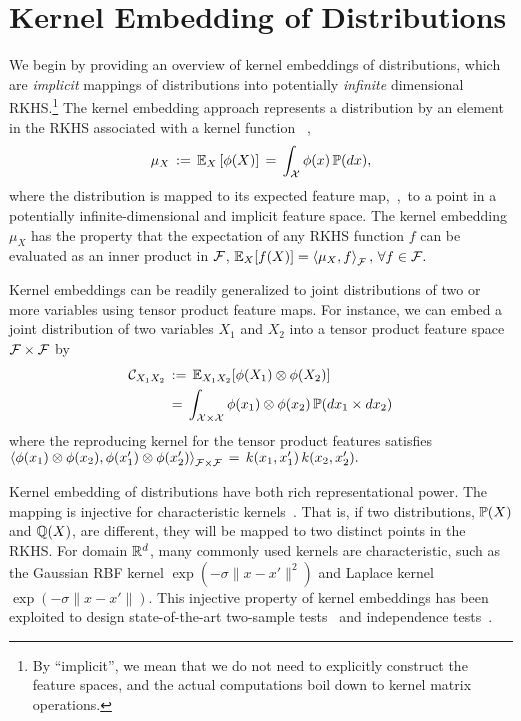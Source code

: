 \documentclass{article}
\begin{document}
\section{Kernel Embedding of Distributions}
\label{sec:embedding}

We begin by providing an overview of kernel embeddings of distributions, which are \emph{implicit} mappings of distributions into potentially \emph{infinite} dimensional RKHS.\footnote{By ``implicit'', we mean that we do not need to explicitly construct the feature spaces, and the actual computations boil down to kernel matrix operations.} The kernel embedding approach represents a distribution by an element in the RKHS associated with a kernel function \, \cite{SmoGreSonSch07,SriGreFukLanetal08},
\begin{align}
  \mu_{X} \, := \, \mathbb{E}_{X} \left[\phi(X)\right] \, = \, \int_{\mathcal{X}} \phi(x) \, \mathbb{P}(dx),  \label{eq:embedding}
\end{align}
where the distribution is mapped to its expected feature map,~\ie,~to a point in a potentially infinite-dimensional and implicit feature space.
 The kernel embedding $\mu_{X}$ has the property that the expectation of any RKHS function $f$ can be evaluated as an inner product in $\mathcal{F}$,
$
  \mathbb{E}_{X} [f(X)] = \left\langle \mu_{X},f \right\rangle_{\mathcal{F}}, \, \forall f\in\mathcal{F}.
$

Kernel embeddings can be readily generalized to joint distributions of two or more variables using tensor product feature maps. For instance, we can embed a joint distribution of two variables $X_1$ and $X_2$ into a tensor product feature space $\mathcal{F}\times \mathcal{F}$ by
\begin{align}
    \mathcal{C}_{X_1X_2} \, &:= \, \mathbb{E}_{X_1X_2}[\phi(X_1)\otimes \phi(X_2)] \\ 
    \, &= \, \int_{\mathcal{X} \times \mathcal{X}} \phi(x_1) \otimes \phi(x_2) \, \mathbb{P}(dx_1 \times dx_2)
\end{align}
where the reproducing kernel for the tensor product features satisfies
$
	\left\langle \phi(x_1)\otimes \phi(x_2) ,\phi(x_1')\otimes \phi(x_2')  \right\rangle_{\mathcal{F}\times \mathcal{F}} \, = \,  k(x_1,x_1')\,k(x_2,x_2').
$

Kernel embedding of distributions have both rich representational power. The mapping is injective for characteristic kernels~\cite{SriGreFukLanetal08}. That is, if two distributions, $\mathbb{P}(X)$ and $\mathbb{Q}(X)$, are different, they will be mapped to two distinct points in the RKHS. For domain $\mathbb{R}^d$, many commonly used kernels are characteristic, such as the Gaussian RBF kernel $\exp(-\sigma \|x - x'\|^2)$ and Laplace kernel $\exp(-\sigma \|x - x'\|)$.
This injective property of kernel embeddings has been exploited to design  state-of-the-art two-sample tests~\cite{GreBorRasSchetal12} and  independence tests~\cite{GreFukTeoSonetal08}.
\end{document}
